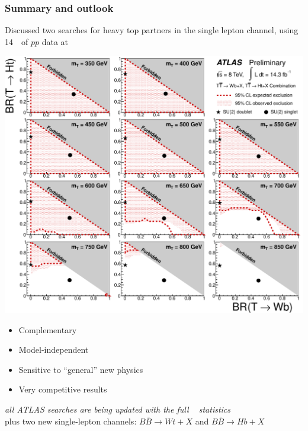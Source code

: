 
\begin{frame}\frametitle{Summary and outlook}
\footnotesize\centering

\begin{minipage}{.7\textwidth}\centering

Discussed two searches for heavy top partners in the single lepton channel, using 14~\ifb\ of $pp$ data at ~\tev

\myskip

\begin{minipage}{.45\textwidth}\centering

\includegraphics[width=1.\textwidth]{pics/combo/lim_Scan2D_comb.pdf}

\end{minipage}\begin{minipage}{.55\textwidth}\centering

\begin{itemize}
\item Complementary
\item Model-independent
\item Sensitive to ``general'' new physics
\item Very competitive results
\end{itemize}

\end{minipage}


\end{minipage}

\myskip

{\it all ATLAS searches are being updated with the full {~\ifb} statistics}\\ plus two new single-lepton channels: $B\bar{B}\to Wt+X$ and $B\bar{B}\to Hb+X$

\end{frame}



